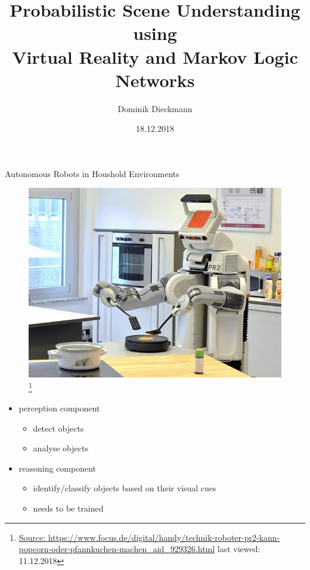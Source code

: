 \documentclass[]{beamer}
\title[Short version]{Probabilistic Scene Understanding using\\ Virtual Reality and Markov Logic Networks}
\subtitle[]{}
\date[]{18.12.2018}
\author[D. Dieckmann]{Dominik Dieckmann}
\institute[Uni Bremen]{Institute for Artificial Intelligence \\ University Bremen}
\begin{document}
\beamertemplatenavigationsymbolsempty

\begin{frame}
	\maketitle
\end{frame}

\begin{frame}{Autonomous Robots in Houshold Environments}
	\begin{figure}
		\includegraphics[scale=.25]{img/pr2.jpg}\footnote{\tiny{\url{Source: https://www.focus.de/digital/handy/technik-roboter-pr2-kann-popcorn-oder-pfannkuchen-machen\_aid\_929326.html} last viewed: 11.12.2018}}
	\end{figure}
	\begin{itemize}
		\item perception component
			\begin{itemize}
				\item detect objects
				\item analyse objects
			\end{itemize}
		\item reasoning component
			\begin{itemize}
				\item identify/classify objects based on their visual cues
				\item needs to be trained
			\end{itemize}
	\end{itemize}
\end{frame}
\end{document}
